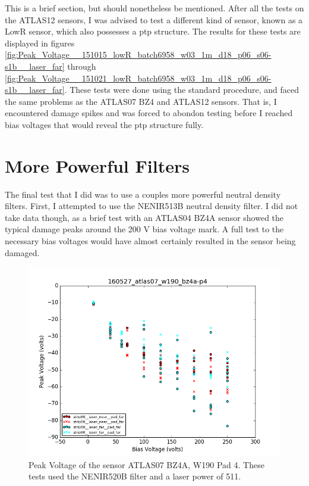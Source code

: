 \documentclass{report}
\begin{document}
            This is a brief section, but should nonetheless be mentioned. After all the tests on the ATLAS12 sensors, I was advised to test a different kind of sensor, known as a LowR sensor, which also possesses a ptp structure. The results for these tests are displayed in figures \ref{fig:Peak_Voltage__151015_lowR_batch6958_w03_1m_d18_p06_s06-s1b__laser_far} through \ref{fig:Peak_Voltage__151021_lowR_batch6958_w03_1m_d18_p06_s06-s1b__laser_far}. These tests were done using the standard procedure, and faced the same problems as the ATLAS07 BZ4 and ATLAS12 sensors. That is, I encountered damage spikes and was forced to abondon testing before I reached bias voltages that would reveal the ptp structure fully.



        \section{More Powerful Filters} \label{sect:new_filters}
            The final test that I did was to use a couples more powerful neutral density filters. First, I attempted to use the NENIR513B neutral density filter. I did not take data though, as a brief test with an ATLAS04 BZ4A sensor showed the typical damage peaks around the 200 V bias voltage mark. A full test to the necessary bias voltages would have almost certainly resulted in the sensor being damaged.  

            \begin{figure}[h] 
                \includegraphics[height=.4\textheight]{160527_atlas07_w190_bz4a-p4}
                \centering
                \caption{ Peak Voltage of the sensor ATLAS07 BZ4A, W190 Pad 4. These tests used the NENIR520B filter and a laser power of 511. }
                \label{fig:160527_atlas07_w190_bz4a-p4}
            \end{figure}
\end{document}

